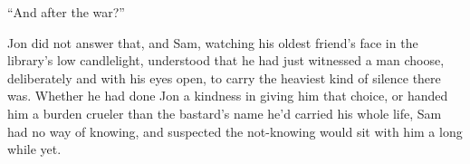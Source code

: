 “And after the war?”

Jon did not answer that, and Sam, watching his oldest friend’s face in the library’s low candlelight, understood that he had just witnessed a man choose, deliberately and with his eyes open, to carry the heaviest kind of silence there was. Whether he had done Jon a kindness in giving him that choice, or handed him a burden crueler than the bastard’s name he’d carried his whole life, Sam had no way of knowing, and suspected the not-knowing would sit with him a long while yet.